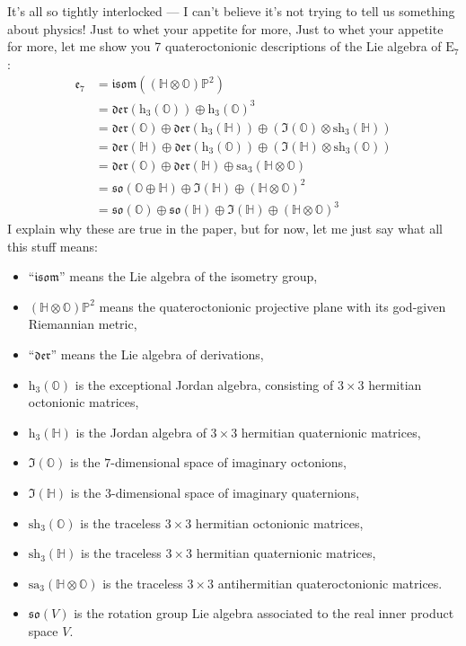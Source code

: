 \documentclass{article}
\def\tightlist{}
\begin{document}
It's all so tightly interlocked --- I can't believe it's not trying to
tell us something about physics! Just to whet your appetite for more,
Just to whet your appetite for more, let me show you 7 quateroctonionic
descriptions of the Lie algebra of \(\mathrm{E}_7\): \[
  \begin{aligned}
    \mathfrak{e}_7
    &= \mathfrak{isom}((\mathbb{H}\otimes\mathbb{O})\mathbb{P}^2)
  \\&= \mathfrak{der}(\mathrm{h}_3(\mathbb{O}))\oplus\mathrm{h}_3(\mathbb{O})^3
  \\&= \mathfrak{der}(\mathbb{O})\oplus\mathfrak{der}(\mathrm{h}_3(\mathbb{H}))\oplus(\Im(\mathbb{O})\otimes\mathrm{sh}_3(\mathbb{H}))
  \\&= \mathfrak{der}(\mathbb{H})\oplus\mathfrak{der}(\mathrm{h}_3(\mathbb{O}))\oplus(\Im(\mathbb{H})\otimes\mathrm{sh}_3(\mathbb{O}))
  \\&= \mathfrak{der}(\mathbb{O})\oplus\mathfrak{der}(\mathbb{H})\oplus\mathrm{sa}_3(\mathbb{H}\otimes\mathbb{O})
  \\&= \mathfrak{so}(\mathbb{O}\oplus\mathbb{H})\oplus\Im(\mathbb{H})\oplus(\mathbb{H}\otimes\mathbb{O})^2
  \\&= \mathfrak{so}(\mathbb{O})\oplus\mathfrak{so}(\mathbb{H})\oplus\Im(\mathbb{H})\oplus(\mathbb{H}\otimes\mathbb{O})^3
  \end{aligned}
\] I explain why these are true in the paper, but for now, let me just
say what all this stuff means:

\begin{itemize}
\tightlist
\item
  ``\(\mathfrak{isom}\)'' means the Lie algebra of the isometry group,
\item
  \((\mathbb{H}\otimes\mathbb{O})\mathbb{P}^2\) means the
  quateroctonionic projective plane with its god-given Riemannian
  metric,
\item
  ``\(\mathfrak{der}\)'' means the Lie algebra of derivations,
\item
  \(\mathrm{h}_3(\mathbb{O})\) is the exceptional Jordan algebra,
  consisting of \(3\times3\) hermitian octonionic matrices,
\item
  \(\mathrm{h}_3(\mathbb{H})\) is the Jordan algebra of \(3\times3\)
  hermitian quaternionic matrices,
\item
  \(\Im(\mathbb{O})\) is the \(7\)-dimensional space of imaginary
  octonions,
\item
  \(\Im(\mathbb{H})\) is the \(3\)-dimensional space of imaginary
  quaternions,
\item
  \(\mathrm{sh}_3(\mathbb{O})\) is the traceless \(3\times3\) hermitian
  octonionic matrices,
\item
  \(\mathrm{sh}_3(\mathbb{H})\) is the traceless \(3\times3\) hermitian
  quaternionic matrices,
\item
  \(\mathrm{sa}_3(\mathbb{H}\otimes\mathbb{O})\) is the traceless
  \(3\times3\) antihermitian quateroctonionic matrices.
\item
  \(\mathfrak{so}(V)\) is the rotation group Lie algebra associated to
  the real inner product space \(V\).
\end{itemize}
\end{document}
